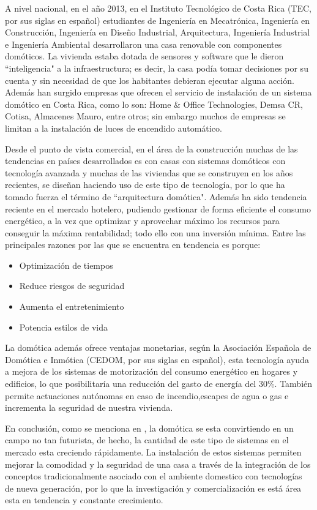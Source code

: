 A nivel nacional, en el año 2013, en el Instituto Tecnológico de Costa Rica (TEC, por sus siglas en español) estudiantes de Ingeniería en Mecatrónica, Ingeniería en Construcción, Ingeniería en Diseño Industrial, Arquitectura, Ingeniería Industrial e Ingeniería Ambiental desarrollaron una casa renovable con componentes domóticos. La vivienda estaba dotada de sensores y software que le dieron ``inteligencia" a la infraestructura; es decir, la casa podía tomar decisiones por su cuenta y sin necesidad de que los habitantes debieran ejecutar alguna acción. Además han surgido empresas que ofrecen el servicio de instalación de un sistema domótico en Costa Rica, como lo son: Home \& Office Technologies, Demsa CR, Cotisa, Almacenes Mauro, entre otros; sin embargo muchos de empresas se limitan a la instalación de luces de encendido automático.

Desde el punto de vista comercial, en el área de la construcción muchas de las tendencias en países desarrollados es con casas con sistemas domóticos con tecnología avanzada y muchas de las viviendas que se construyen en los años recientes, se diseñan haciendo uso de este tipo de tecnología, por lo que ha tomado fuerza el término de ``arquitectura domótica". Además ha sido tendencia reciente en el mercado hotelero, pudiendo gestionar de forma eficiente el consumo energético, a la vez que optimizar y aprovechar máximo los recursos para conseguir la máxima rentabilidad; todo ello con una inversión mínima. Entre las principales razones por las que se encuentra en tendencia es porque: 

\begin{itemize}
\item Optimización de tiempos
\item Reduce riesgos de seguridad
\item Aumenta el entretenimiento
\item Potencia estilos de vida
\end{itemize}

La domótica además ofrece ventajas monetarias, según la Asociación Española de Domótica e Inmótica (CEDOM, por sus siglas en español), esta tecnología ayuda a mejora de los sistemas de motorización del consumo energético en hogares y edificios, lo que posibilitaría una reducción del gasto de energía del 30\%. También permite actuaciones autónomas en caso de incendio,escapes de agua o gas e incrementa la seguridad de nuestra vivienda.  

En conclusión, como se menciona en \cite{Sechi2010}, la domótica se esta convirtiendo en un campo no tan futurista, de hecho, la cantidad de este tipo de sistemas en el mercado esta creciendo rápidamente. La instalación de estos sistemas permiten mejorar la comodidad y la seguridad de una casa a través de la integración de los conceptos tradicionalmente asociado con el ambiente domestico con tecnologías de nueva generación, por lo que la investigación y comercialización es está área esta en tendencia y constante crecimiento.

